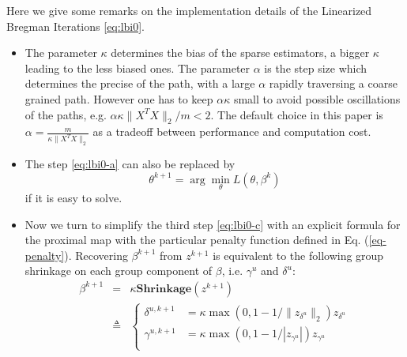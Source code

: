 \documentclass[10pt,journal,cspaper,compsoc]{IEEEtran}
\def\R{{\mathbb R}}        %
\begin{document}
{Here we give some remarks on the implementation details of the Linearized Bregman Iterations \eqref{eq:lbi0}.
\begin{itemize}
\item The parameter $\kappa$ determines the bias of the sparse estimators, a bigger $\kappa$ leading to the less biased ones. The parameter $\alpha$ is the step size which determines the precise of the path, with a large $\alpha$ rapidly traversing a coarse grained path. However one has to keep $\alpha \kappa$ small to avoid possible oscillations of the paths, e.g. $\alpha \kappa \|X^T X\|_2/m<2$. The default choice in this paper is $\alpha  = \frac{m}{\kappa\|X^TX\|_2}$ as a tradeoff between performance and computation cost.
\item The step \eqref{eq:lbi0-a} can also be replaced by $$\theta^{k+1}  = \arg\min_{\theta}L(\theta,\beta^k)$$ if it is easy to solve.
\item Now we turn to simplify the third step \eqref{eq:lbi0-c} with an explicit formula for the proximal map with the particular penalty function defined in Eq. (\ref{eq-penalty}). Recovering $\beta^{k+1}$ from $z^{k+1}$ is equivalent to the following group shrinkage on each group component of $\beta$, i.e. $\gamma^u$ and $\delta^u$:
\begin{eqnarray}
\beta^{k+1} &=& \kappa \mathbf{Shrinkage}(z^{k+1})\\
&\triangleq &\left\{
\begin{aligned}
\delta^{u,k+1} &= \kappa\max(0,1-1/\|z_{\delta^u}\|_2)z_{\delta^u} \nonumber \\
\gamma^{u,k+1} &= \kappa\max(0,1-1/|z_{\gamma^u}|)z_{\gamma^u} \nonumber \\
\end{aligned}
\right.
\end{eqnarray}
\end{itemize}


}
\end{document}
